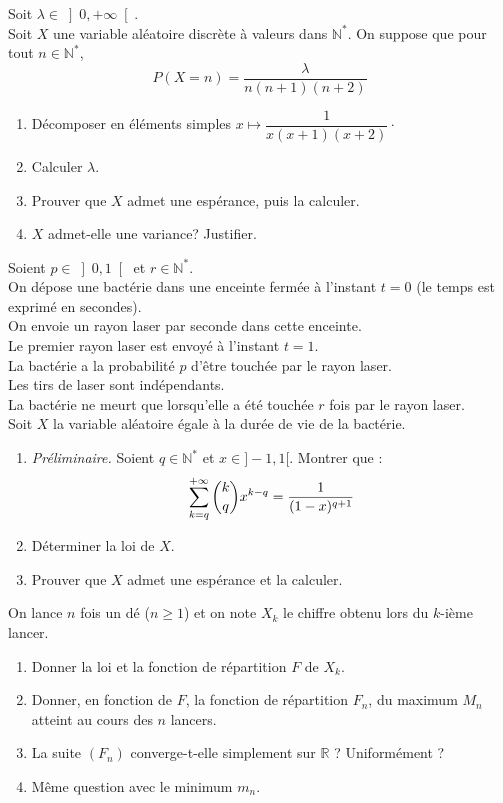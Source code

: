 \documentclass[a4paper,10pt]{report}
\begin{document}
\begin{Exercice}{}Soit $\lambda \in{\left] 0,+\infty\right[ }$.\\
Soit $X$ une variable aléatoire discrète à valeurs dans $\mathbb{N}^\ast$. On suppose que pour tout $n \in \mathbb{N}^*$, 
$$P(X=n)=\dfrac{\lambda}{n(n+1)(n+2)} $$
\begin{enumerate}
\item Décomposer en éléments simples $x \mapsto \dfrac{1}{x(x+1)(x+2)} \cdot$
\item
Calculer $\lambda$.
\item
Prouver que $X$ admet une espérance, puis la calculer.
\item
$X$ admet-elle une variance? Justifier.
\end{enumerate}
\end{Exercice}



\begin{Exercice}{} Soient $p\in \left] 0,1\right[$ et $r\in\mathbb{N}^*$.\\
On dépose une bactérie dans une enceinte fermée à l'instant $t=0$ (le temps est exprimé en secondes).\\
On envoie un rayon laser par seconde dans cette enceinte.\\
Le premier rayon laser est envoyé à l'instant $t=1$.\\
La bactérie a la probabilité $p$ d'être touchée par le rayon laser.\\
Les tirs de laser sont indépendants.\\
La bactérie ne meurt que lorsqu'elle a été touchée $r$ fois par le rayon laser.\\
Soit $X$ la variable aléatoire égale à la durée de vie de la bactérie.\\
\begin{enumerate}
\item \textit{Préliminaire.} Soient $q \in \mathbb{N}^*$ et $x \in ]-1,1[$. Montrer que : 
$$ \sum\limits_{k=q}^{+\infty}\dbinom{k}{q}x^{k-q}=\dfrac{1}{(1-x)^{q+1}}$$
\item
Déterminer la loi de $X$.
\item
Prouver que $X$ admet une espérance et la calculer.
\end{enumerate}
\end{Exercice}




\begin{Exercice}{} On lance $n$ fois un dé ($n \geq 1$) et on note $X_k$ le chiffre obtenu lors du $k$-ième lancer.
\begin{enumerate}
\item Donner la loi et la fonction de répartition $F$ de $X_k$.
\item Donner, en fonction de $F$, la fonction de répartition $F_n$, du maximum $M_n$ atteint au cours des $n$ lancers.
\item La suite $(F_n)$ converge-t-elle simplement sur $\mathbb{R}$ ? Uniformément ?
\item Même question avec le minimum $m_n$.
\end{enumerate}
\end{Exercice}
\end{document}
